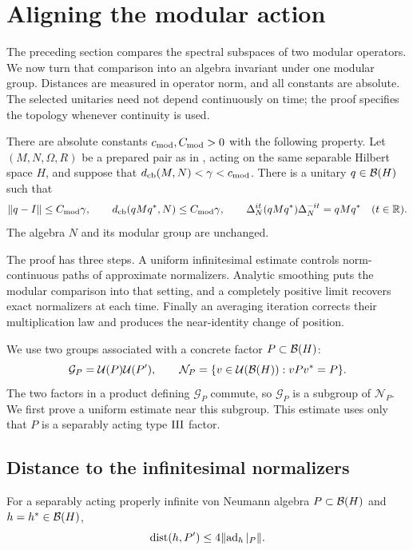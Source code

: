 \section{Aligning the modular action}
\label{sec:modular-alignment}

The preceding section compares the spectral subspaces of two modular
operators. We now turn that comparison into an algebra invariant under
one modular group. Distances are measured in operator norm, and all
constants are absolute. The selected unitaries need not depend
continuously on time; the proof specifies the topology whenever
continuity is used.

\begin{proposition}
\label{prop:modular-alignment}
There are absolute constants $c_{\rm mod},C_{\rm mod}>0$ with the
following property. Let $(M,N,\Omega,R)$ be a prepared pair as in
, acting on the same separable Hilbert space
$H$, and suppose that $d_{\mathrm{cb}}(M,N)<\gamma<c_{\rm mod}$.
There is a unitary $q\in\mathcal B(H)$ such that
\[
 \lVert q-I\rVert\le C_{\rm mod}\gamma,
 \qquad d_{\mathrm{cb}}(qMq^*,N)\le C_{\rm mod}\gamma,
 \qquad
 \Delta_N^{it}(qMq^*)\Delta_N^{-it}=qMq^*
 \quad(t\in\mathbb R).
\]
The algebra $N$ and its modular group are unchanged.
\end{proposition}

The proof has three steps. A uniform infinitesimal estimate controls
norm-continuous paths of approximate normalizers. Analytic smoothing
puts the modular comparison into that setting, and a completely
positive limit recovers exact normalizers at each time. Finally an
averaging iteration corrects their multiplication law and produces
the near-identity change of position.

We use two groups associated with a concrete factor $P\subset\mathcal B(H)$:
\[
 \mathcal G_P=\mathcal U(P)\mathcal U(P'),\qquad
 \mathcal N_P=\{v\in\mathcal U(\mathcal B(H)):vPv^*=P\}.
\]
The two factors in a product defining $\mathcal G_P$ commute, so
$\mathcal G_P$ is a subgroup of $\mathcal N_P$. We first prove a
uniform estimate near this subgroup. This estimate uses only that $P$
is a separably acting type $\mathrm{III}$ factor.

\subsection{Distance to the infinitesimal normalizers}

\begin{lemma}
\label{lem:infinite-commutant-bound}
For a separably acting properly infinite von Neumann algebra
$P\subset\mathcal B(H)$ and $h=h^*\in\mathcal B(H)$,
\[
 \operatorname{dist}(h,P')\le4\lVert\operatorname{ad}_h|_P\rVert.
\]
\end{lemma}

